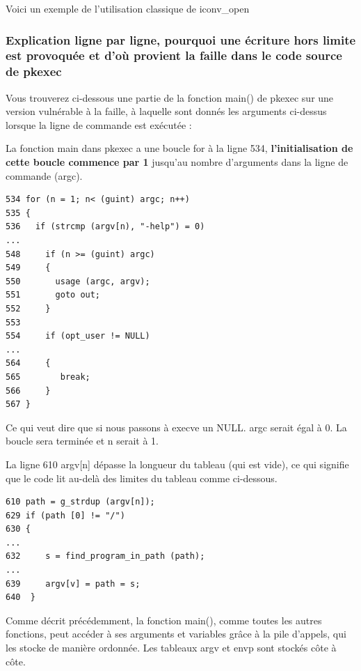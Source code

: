 \documentclass[12pt,a4paper]{article}
\begin{document}
\begin{flushleft}
                \item Voici un exemple de l'utilisation classique de iconv\_open
                \begin{center}
   		  
                \end{center}
                
                \cite{iconvman:online}
                \cite{gconvpath:online}
            \subsubsection{Explication ligne par ligne, pourquoi une écriture hors limite est provoquée et d'où provient la faille dans le code source de pkexec}
                \item  Vous trouverez ci-dessous une partie de la fonction main() de pkexec sur une version vulnérable à la faille, à laquelle sont donnés les arguments ci-dessus lorsque la ligne de commande est exécutée :
                \item La fonction main{} dans pkexec a une boucle for à la ligne 534, \textbf{l'initialisation de cette boucle commence par 1} jusqu'au nombre d'arguments dans la ligne de commande (argc).
                \begin{lstlisting}
534 for (n = 1; n< (guint) argc; n++)
535 {
536   if (strcmp (argv[n), "-help") = 0)
...
548     if (n >= (guint) argc)
549     {
550       usage (argc, argv);  
551       goto out;
552     }
553
554     if (opt_user != NULL)
...
564     {
565        break;
566     }
567 }
                \end{lstlisting}
                \item Ce qui veut dire que si nous passons à execve un NULL. argc serait égal à 0. La boucle sera terminée et n serait à 1.
                \newpage
                \item La ligne 610 argv[n] dépasse la longueur du tableau (qui est vide), ce qui signifie que le code lit au-delà des limites du tableau comme ci-dessous.
                \begin{lstlisting}
610 path = g_strdup (argv[n]);
629 if (path [0] != "/")
630 {
...
632     s = find_program_in_path (path);
...
639     argv[v] = path = s;
640  }
                \end{lstlisting}
                \item Comme décrit précédemment, la fonction main(), comme toutes les autres fonctions, peut accéder à ses arguments et variables grâce à la pile d’appels, qui les stocke de manière ordonnée. Les tableaux argv et envp sont stockés côte à côte.

\end{flushleft}
\end{document}
